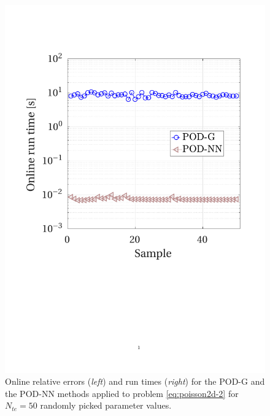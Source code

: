 \documentclass[12pt, a4paper, twoside, openright, notitlepage]{report}
\numberwithin{equation}{chapter}
\theoremstyle{theorem}
\theoremstyle{definition}
\theoremstyle{remark}
\theoremstyle{proposition}
\numberwithin{figure}{chapter}
\begin{document}
\begin{figure}[H]
			\includegraphics[scale = 0.38, trim = {1.5cm 8.25cm 1.5cm 3.5cm}, clip]{poisson2d_2_time}
			
			\vspace*{-0.2cm}
			
			\caption{Online relative errors (\emph{left}) and run times (\emph{right}) for the POD-G and the POD-NN methods applied to problem \eqref{eq:poisson2d-2} for $N_{te} = 50$ randomly picked parameter values.}
			\label{fig:poisson2d-2-fig2}
		
		

\end{figure}
\end{document}
